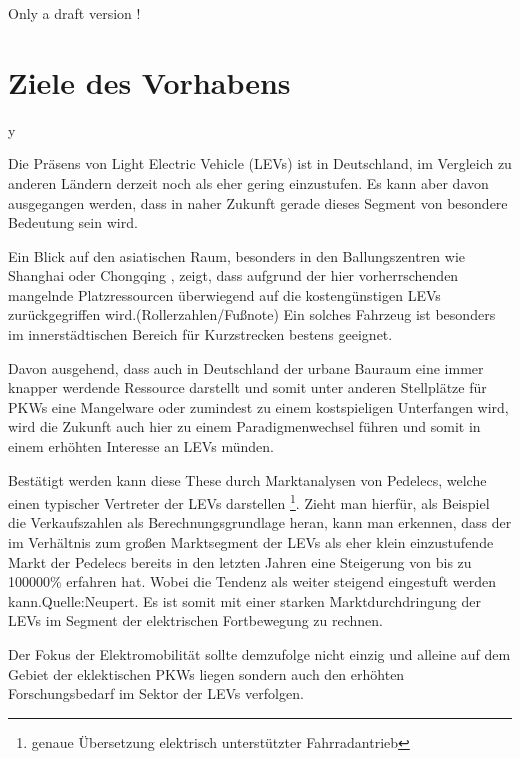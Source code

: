 Only a draft  version !

\chapter{Ziele des Vorhabens}
\label{sec:ZieleDesVorhabens}
y

Die Präsens von Light Electric Vehicle (LEVs) ist in Deutschland, im Vergleich zu anderen Ländern derzeit noch als eher gering einzustufen. Es kann aber davon ausgegangen werden, dass in naher Zukunft gerade dieses Segment von besondere Bedeutung sein wird. 

Ein Blick auf den asiatischen Raum, besonders in den Ballungszentren wie Shanghai oder Chongqing , zeigt, dass aufgrund der hier vorherrschenden mangelnde Platzressourcen überwiegend auf die kostengünstigen LEVs zurückgegriffen wird.(Rollerzahlen/Fußnote)
Ein solches Fahrzeug ist besonders im innerstädtischen Bereich für Kurzstrecken bestens geeignet.

Davon ausgehend, dass auch in Deutschland der urbane Bauraum eine immer knapper werdende Ressource darstellt und somit unter anderen Stellplätze für PKWs eine Mangelware oder zumindest zu einem  kostspieligen Unterfangen wird, wird die Zukunft auch hier zu einem Paradigmenwechsel führen und somit in einem erhöhten Interesse an LEVs münden.

Bestätigt werden kann diese These durch Marktanalysen von Pedelecs, welche einen typischer Vertreter der LEVs darstellen \footnote{ genaue Übersetzung elektrisch unterstützter Fahrradantrieb}. 
Zieht man hierfür, als Beispiel die Verkaufszahlen  als Berechnungsgrundlage heran, kann man erkennen, dass der im Verhältnis zum großen Marktsegment der LEVs als eher klein einzustufende Markt der Pedelecs bereits in den letzten Jahren eine Steigerung von bis zu 100000\% erfahren hat. Wobei die Tendenz als weiter steigend eingestuft werden kann.Quelle:Neupert.
Es ist somit mit einer starken Marktdurchdringung der LEVs im Segment der elektrischen Fortbewegung zu rechnen.

Der Fokus der Elektromobilität sollte demzufolge nicht einzig und alleine auf dem Gebiet der eklektischen PKWs liegen sondern auch den erhöhten Forschungsbedarf im Sektor der LEVs verfolgen.

